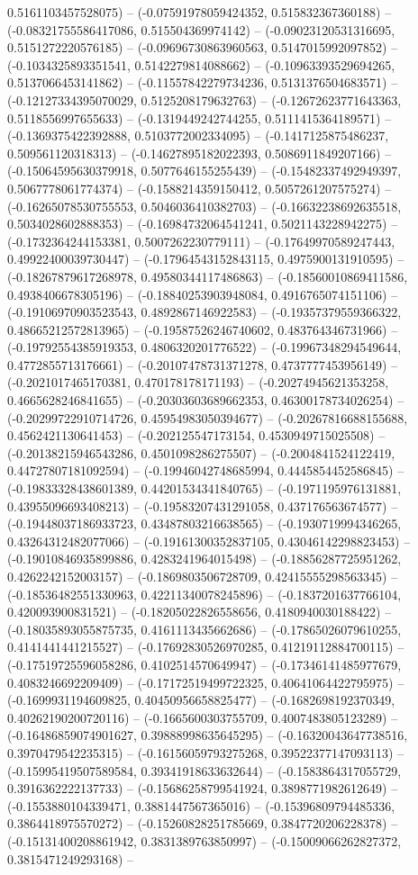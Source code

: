 0.5161103457528075) -- (-0.07591978059424352, 0.515832367360188) -- (-0.08321755586417086, 0.515504369974142) -- (-0.09023120531316695, 0.5151272220576185) -- (-0.09696730863960563, 0.5147015992097852) -- (-0.1034325893351541, 0.5142279814088662) -- (-0.10963393529694265, 0.5137066453141862) -- (-0.11557842279734236, 0.5131376504683571) -- (-0.12127334395070029, 0.5125208179632763) -- (-0.12672623771643363, 0.5118556997655633) -- (-0.1319449242744255, 0.5111415364189571) -- (-0.1369375422392888, 0.5103772002334095) -- (-0.1417125875486237, 0.509561120318313) -- (-0.14627895182022393, 0.5086911849207166) -- (-0.15064595630379918, 0.5077646155255439) -- (-0.15482337492949397, 0.5067778061774374) -- (-0.1588214359150412, 0.5057261207575274) -- (-0.16265078530755553, 0.5046036410382703) -- (-0.16632238692635518, 0.5034028602888353) -- (-0.16984732064541241, 0.5021143228942275) -- (-0.1732364244153381, 0.5007262230779111) -- (-0.17649970589247443, 0.49922400039730447) -- (-0.17964543152843115, 0.4975900131910595) -- (-0.18267879617268978, 0.49580344117486863) -- (-0.18560010869411586, 0.4938406678305196) -- (-0.18840253903948084, 0.4916765074151106) -- (-0.19106970903523543, 0.4892867146922583) -- (-0.19357379559366322, 0.48665212572813965) -- (-0.19587526246740602, 0.483764346731966) -- (-0.19792554385919353, 0.4806320201776522) -- (-0.19967348294549644, 0.4772855713176661) -- (-0.20107478731371278, 0.4737777453956149) -- (-0.2021017465170381, 0.470178178171193) -- (-0.20274945621353258, 0.4665628246841655) -- (-0.20303603689662353, 0.46300178734026254) -- (-0.20299722910714726, 0.45954983050394677) -- (-0.20267816688155688, 0.4562421130641453) -- (-0.202125547173154, 0.4530949715025508) -- (-0.20138215946543286, 0.4501098286275507) -- (-0.2004841524122419, 0.44727807181092594) -- (-0.19946042748685994, 0.4445854452586845) -- (-0.19833328438601389, 0.44201534341840765) -- (-0.1971195976131881, 0.43955096693408213) -- (-0.19583207431291058, 0.437176563674577) -- (-0.19448037186933723, 0.43487803216638565) -- (-0.1930719994346265, 0.43264312482077066) -- (-0.19161300352837105, 0.43046142298823453) -- (-0.19010846935899886, 0.4283241964015498) -- (-0.18856287725951262, 0.4262242152003157) -- (-0.1869803506728709, 0.42415555298563345) -- (-0.18536482551330963, 0.42211340078245896) -- (-0.1837201637766104, 0.420093900831521) -- (-0.18205022826558656, 0.4180940030188422) -- (-0.18035893055875735, 0.4161113435662686) -- (-0.17865026079610255, 0.4141441441215527) -- (-0.17692830526970285, 0.41219112884700115) -- (-0.17519725596058286, 0.4102514570649947) -- (-0.17346141485977679, 0.4083246692209409) -- (-0.17172519499722325, 0.40641064422795975) -- (-0.1699931194609825, 0.40450956658825477) -- (-0.1682698192370349, 0.40262190200720116) -- (-0.1665600303755709, 0.4007483805123289) -- (-0.16486859074901627, 0.39888998635645295) -- (-0.16320043647738516, 0.3970479542235315) -- (-0.16156059793275268, 0.39522377147093113) -- (-0.15995419507589584, 0.39341918633632644) -- (-0.1583864317055729, 0.3916362222137733) -- (-0.15686258799541924, 0.3898771982612649) -- (-0.1553880104339471, 0.3881447567365016) -- (-0.15396809794485336, 0.3864418975570272) -- (-0.15260828251785669, 0.3847720206228378) -- (-0.15131400208861942, 0.3831389763850997) -- (-0.15009066262827372, 0.3815471249293168) -- 